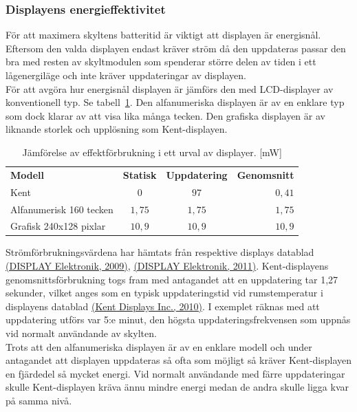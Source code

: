 \documentclass[a4paper,11pt]{article}
\begin{document}
\subsubsection{Displayens energieffektivitet}
För att maximera skyltens batteritid är viktigt att displayen är energisnål. Eftersom den valda displayen endast kräver ström då den uppdateras passar den bra med resten av skyltmodulen som spenderar större delen av tiden i ett lågenergiläge och inte kräver uppdateringar av displayen.\\

För att avgöra hur energisnål displayen är jämförs den med LCD-displayer av konventionell typ. Se tabell~\ref{tab:kenttable}. Den alfanumeriska displayen är av en enklare typ som dock klarar av att visa lika många tecken. Den grafiska displayen är av liknande storlek och upplösning som Kent-displayen.\\

\begin{table}[h]
\centering
    \begin{tabular}{|l|c|c|r|}
    {\bf Modell} & {\bf Statisk} & {\bf Uppdatering} & {\bf Genomsnitt} \\
    Kent & $0$ & $97$ & $0,41$ \\
    Alfanumerisk 160 tecken & $1,75$ & $1,75$ & $1,75$ \\
    Grafisk 240x128 pixlar & $10,9$ & $10,9$ & $10,9$ \\
    \end{tabular}
\caption{Jämförelse av effektförbrukning i ett urval av displayer. [mW]}
\label{tab:kenttable}
\end{table}

Strömförbrukningsvärdena har hämtats från respektive displays datablad \hyperref[lcdalfa]{(DISPLAY Elektronik, 2009)}, \hyperref[lcdgraph]{(DISPLAY Elektronik, 2011)}. Kent-displayens genomsnittsförbrukning togs fram med antagandet att en uppdatering tar 1,27 sekunder, vilket anges som en typisk uppdateringstid vid rumstemperatur i displayens datablad \hyperref[kent]{(Kent Displays Inc., 2010)}. I exemplet räknas med att uppdatering utförs var 5:e minut, den högsta uppdateringsfrekvensen som uppnås vid normalt användande av skylten.\\

Trots att den alfanumeriska displayen är av en enklare modell och under antagandet att displayen uppdateras så ofta som möjligt så kräver Kent-displayen en fjärdedel så mycket energi. Vid normalt användande med färre uppdateringar skulle Kent-displayen kräva ännu mindre energi medan de andra skulle ligga kvar på samma nivå.\\
\end{document}

